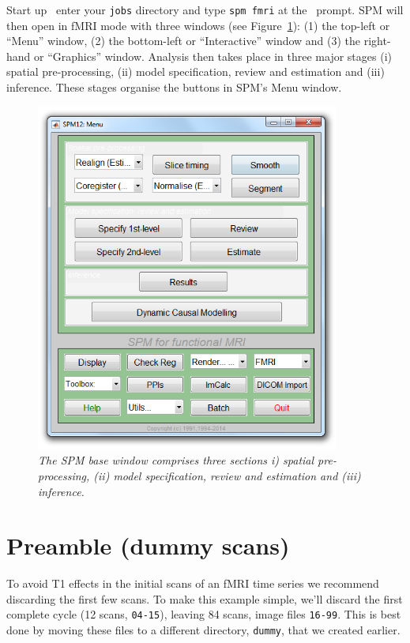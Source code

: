 Start up \matlab\, enter your \texttt{jobs} directory and type \texttt{spm fmri} at the \matlab\ prompt. SPM will then open in fMRI mode with three windows (see Figure~\ref{aud_command}): (1) the top-left or ``Menu'' window, (2) the bottom-left or ``Interactive'' window and (3) the right-hand or ``Graphics'' window. Analysis then takes place in three major stages (i) spatial pre-processing, (ii) model specification, review and estimation and (iii) inference. These stages organise the buttons in SPM's Menu window.

\begin{figure}
\begin{center}
\includegraphics[width=100mm]{auditory/command}
\caption{\em The SPM base window comprises three sections i) spatial pre-processing, (ii) model specification, review and estimation and (iii) inference. \label{aud_command}}
\end{center}
\end{figure}

\section{Preamble (dummy scans)}

To avoid T1 effects in the initial scans of an fMRI time series we recommend discarding the first few scans. To make this example simple, we'll discard the first complete cycle (12 scans, \texttt{04-15}), leaving 84 scans, image files \texttt{16-99}. This is best done by moving these files to a different directory, \texttt{dummy}, that we created earlier.

